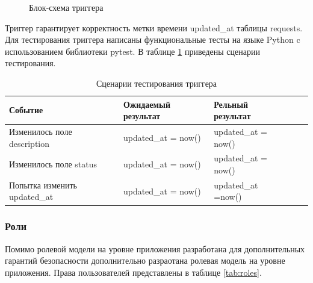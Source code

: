 \begin{figure}[h!]
	\caption{Блок-схема триггера}
	\label{fig:trigger}
\end{figure}

Триггер гарантирует корректность метки времени updated{\_}at таблицы requests. Для тестирования триггера написаны функциональные тесты на языке Python c использованием библиотеки pytest. В таблице \ref{tab:trigger_tests} приведены сценарии тестирования.

\begin{table}[ht!]
	\centering
	\caption{\label{tab:trigger_tests} Сценарии тестирования триггера}
	\begin{tabular}{|l|l|l|l|l|}
		\hline
		\textbf{Событие} & \textbf{Ожидаемый результат} & \textbf{Рельный результат}\\
		\hline
		Изменилось поле description & updated{\_}at = now() & updated{\_}at = now() \\
		\hline
		Изменилось поле status & updated{\_}at = now() & updated{\_}at =  now() \\
		\hline
		Попытка изменить updated{\_}at & updated{\_}at = now() & updated{\_}at =now() \\
\hline
		
	\end{tabular}
\end{table}

\subsubsection{Роли}

Помимо ролевой модели на уровне приложения разработана для дополнительных гарантий безопасности дополнительно разраотана ролевая модель на уровне приложения.  Права пользователей представлены в таблице \ref{tab:roles}.

